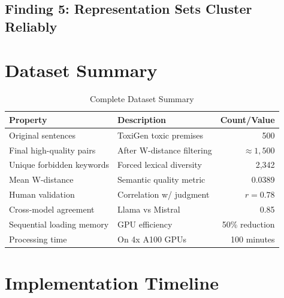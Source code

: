 \documentclass[12pt,a4paper]{report}
\begin{document}
\subsection{Finding 5: Representation Sets Cluster Reliably}
\begin{center}
\end{center}

\section{Dataset Summary}

\begin{table}[H]
\centering
\begin{tabular}{lp{6cm}r}
\toprule
\textbf{Property} & \textbf{Description} & \textbf{Count/Value} \\
\midrule
Original sentences & ToxiGen toxic premises & 500 \\
Final high-quality pairs & After W-distance filtering & $\approx 1,500$ \\
Unique forbidden keywords & Forced lexical diversity & 2,342 \\
Mean W-distance & Semantic quality metric & 0.0389 \\
Human validation & Correlation w/ judgment & $r = 0.78$ \\
Cross-model agreement & Llama vs Mistral & 0.85 \\
Sequential loading memory & GPU efficiency & 50\% reduction \\
Processing time & On 4x A100 GPUs & 100 minutes \\
\bottomrule
\end{tabular}
\caption{Complete Dataset Summary}
\end{table}

\section{Implementation Timeline}
\end{document}
